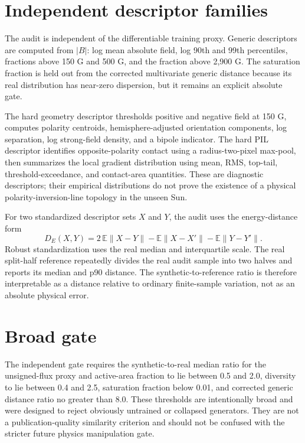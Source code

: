 \documentclass[11pt,oneside]{report}
\begin{document}
\section{Independent descriptor families}

The audit is independent of the differentiable training proxy. Generic descriptors are computed from $|B|$: log mean absolute field, log 90th and 99th percentiles, fractions above 150 G and 500 G, and the fraction above 2,900 G. The saturation fraction is held out from the corrected multivariate generic distance because its real distribution has near-zero dispersion, but it remains an explicit absolute gate.

The hard geometry descriptor thresholds positive and negative field at 150 G, computes polarity centroids, hemisphere-adjusted orientation components, log separation, log strong-field density, and a bipole indicator. The hard PIL descriptor identifies opposite-polarity contact using a radius-two-pixel max-pool, then summarizes the local gradient distribution using mean, RMS, top-tail, threshold-exceedance, and contact-area quantities. These are diagnostic descriptors; their empirical distributions do not prove the existence of a physical polarity-inversion-line topology in the unseen Sun.

For two standardized descriptor sets $X$ and $Y$, the audit uses the energy-distance form
\begin{equation}
  D_E(X,Y)=2\,\mathbb{E}\|X-Y\|-\mathbb{E}\|X-X'\|-\mathbb{E}\|Y-Y'\|.
\end{equation}
Robust standardization uses the real median and interquartile scale. The real split-half reference repeatedly divides the real audit sample into two halves and reports its median and p90 distance. The synthetic-to-reference ratio is therefore interpretable as a distance relative to ordinary finite-sample variation, not as an absolute physical error.

\section{Broad gate}

The independent gate requires the synthetic-to-real median ratio for the unsigned-flux proxy and active-area fraction to lie between 0.5 and 2.0, diversity to lie between 0.4 and 2.5, saturation fraction below 0.01, and corrected generic distance ratio no greater than 8.0. These thresholds are intentionally broad and were designed to reject obviously untrained or collapsed generators. They are not a publication-quality similarity criterion and should not be confused with the stricter future physics manipulation gate.
\end{document}
